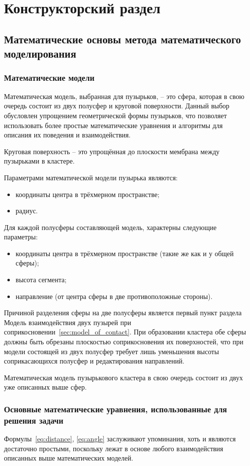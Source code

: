 \chapter{Конструкторский раздел}
\section{Математические основы метода математического моделирования}
\subsection{Математические модели}
Математическая модель, выбранная для пузырьков, -- это сфера, которая в свою очередь состоит из двух полусфер и круговой поверхности. Данный выбор обусловлен упрощением геометрической формы пузырьков, что позволяет использовать более простые математические уравнения и алгоритмы для описания их поведения и взаимодействия.

Круговая поверхность -- это упрощённая до плоскости мембрана между пузырьками в кластере.

Параметрами математической модели пузырька являются:
\begin{itemize}
	\item координаты центра в трёхмерном пространстве;
	\item радиус.
\end{itemize}

Для каждой полусферы составляющей модель, характерны следующие параметры:
\begin{itemize}	
	\item координаты центра в трёхмерном пространстве (такие же как и у общей сферы);
	\item высота сегмента;
	\item направление (от центра сферы в две противоположные стороны).
\end{itemize}

Причиной разделения сферы на две полусферы является первый пункт раздела \guillemotleft Модель взаимодействия двух пузырей при соприкосновении\guillemotright~\ref{sec:model_of_contact}. При образовании кластера обе сферы должны быть обрезаны плоскостью соприкосновения их поверхностей, что при модели состоящей из двух полусфер требует лишь уменьшения высоты соприкасающихся полусфер и редактирования направлений.

Математическая модель пузырькового кластера в свою очередь состоит из двух уже описанных выше сфер. 

\subsection{Основные математические уравнения, использованные для решения задачи}
Формулы~\ref{eq:distance}, \ref{eq:angle} заслуживают упоминания, хоть и являются достаточно простыми, поскольку лежат в основе любого взаимодействия описанных выше математических моделей.

